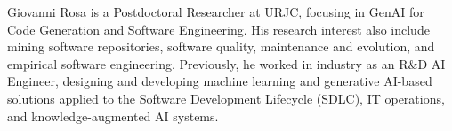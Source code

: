 Giovanni Rosa is a Postdoctoral Researcher at URJC, focusing in GenAI for Code Generation and Software Engineering. His research interest also include mining software repositories, software quality, maintenance and evolution, and empirical software engineering. 
Previously, he worked in industry as an R\&D AI Engineer, designing and developing machine learning and generative AI-based solutions applied to the Software Development Lifecycle (SDLC), IT operations, and knowledge-augmented AI systems.
